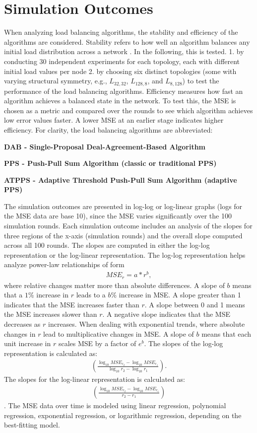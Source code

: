 \chapter{Simulation Outcomes}\label{chap:simulationoutcomes}
When analyzing load balancing algorithms, the stability and efficiency of the algorithms are considered. Stability refers to how well an algorithm balances any initial load distribution across a network \cite{ChengzhongFrancis}. In the following, this is tested. 1. by conducting 30 independent experiments for each topology, each with different initial load values per node 2. by choosing six distinct topologies (some with varying structural symmetry, e.g., $L_{32,32}$, $L_{128,8}$, and $L_{8,128}$) to test the performance of the load balancing algorithms. Efficiency measures how fast an algorithm achieves a balanced state in the network. To test this, the MSE is chosen as a metric and compared over the rounds to see which algorithm achieves low error values faster. A lower MSE at an earlier stage indicates higher efficiency. For clarity, the load balancing algorithms are abbreviated:

\textbf{DAB - Single-Proposal Deal-Agreement-Based Algorithm}

\textbf{PPS - Push-Pull Sum Algorithm (classic or traditional PPS)}

\textbf{ATPPS - Adaptive Threshold Push-Pull Sum Algorithm (adaptive PPS)}

The simulation outcomes are presented in log-log or log-linear graphs (logs for the MSE data are base 10), since the MSE varies significantly over the 100 simulation rounds. Each simulation outcome includes an analysis of the slopes for three regions of the x-axis (simulation rounds) and the overall slope computed across all 100 rounds. The slopes are computed in either the log-log representation or the log-linear representation. The log-log representation helps analyze power-law relationships of form 
\begin{align}
    MSE_r=a*r^{b},
\end{align}
where relative changes matter more than absolute differences. A slope of $b$ means that a $1\%$ increase in $r$ leads to a $b\%$ increase in MSE. A slope greater than 1 indicates that the MSE increases faster than $r$. A slope between 0 and 1 means the MSE increases slower than $r$. A negative slope indicates that the MSE decreases as $r$ increases. When dealing with exponential trends, where absolute changes in $r$ lead to multiplicative changes in MSE. A slope of $b$ means that each unit increase in $r$ scales MSE by a factor of $e^{b}$. The slopes of the log-log representation is calculated as:
\begin{align}
    (\frac{\log_{10}{{MSE_{r_2}}-\log_{10}{MSE_{r_1}}}}{\log_{10}{r_2} - \log_{10}{r_1}}).
\end{align} 
The slopes for the log-linear representation is calculated as:
\begin{align}
    (\frac{\log_{10}{{MSE_{r_2}}-\log_{10}{MSE_{r_1}}}}{r_2 - r_1})
\end{align}
\cite{lorenzo_graphing}.
The MSE data over time is modeled using linear regression, polynomial regression, exponential regression, or logarithmic regression, depending on the best-fitting model.

